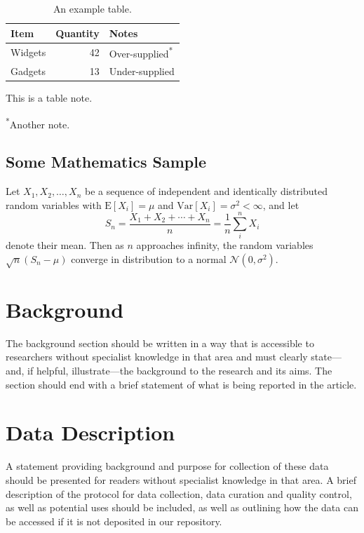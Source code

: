 \documentclass[a4paper,num-refs]{oup-contemporary}
\begin{document}
\begin{table}[bt!]
\caption{An example table.}\label{tab:example}
\begin{tabular}{l r l}
\toprule
Item & Quantity & Notes\\
\midrule
Widgets & 42 & Over-supplied\textsuperscript{*} \\
Gadgets & 13 & Under-supplied \\
\bottomrule
\end{tabular}
\begin{tablenotes}
\item This is a table note.
\item \textsuperscript{*}Another note.
\end{tablenotes}
\end{table}


\subsection{Some Mathematics Sample}

Let $X_1, X_2, \ldots, X_n$ be a sequence of independent and identically distributed random variables with $\text{E}[X_i] = \mu$ and $\text{Var}[X_i] = \sigma^2 < \infty$, and let
%
\begin{equation}
S_n = \frac{X_1 + X_2 + \cdots + X_n}{n}
      = \frac{1}{n}\sum_{i}^{n} X_i
\end{equation}
%
denote their mean. Then as $n$ approaches infinity, the random variables $\sqrt{n}(S_n - \mu)$ converge in distribution to a normal $\mathcal{N}(0, \sigma^2)$.


\section{Background}
\label{sec:background}

The background section should be written in a way that is accessible to researchers without specialist knowledge in that area and must clearly state---and, if helpful, illustrate---the background to the research and its aims. The section should end with a brief statement of what is being reported in the article.


\section{Data Description}

A statement providing background and purpose for collection of these data should be presented for readers without specialist knowledge in that area. A brief description of the protocol for data collection, data curation and quality control, as well as potential uses should be included, as well as outlining how the data can be accessed if it is not deposited in our repository.
\end{document}
